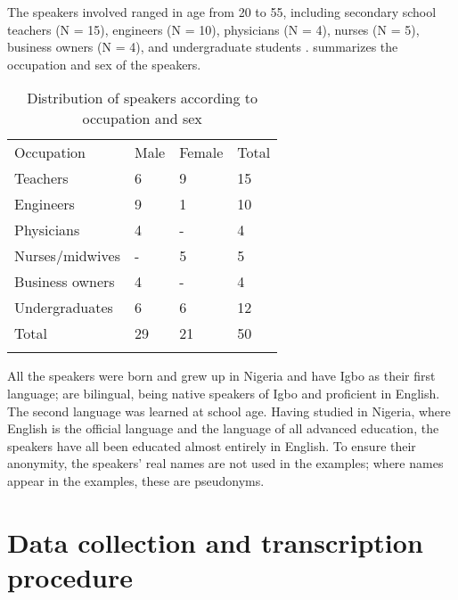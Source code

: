 \documentclass[output=paper]{langsci/langscibook}
\begin{document}
The speakers involved ranged in age from 20 to 55, including secondary school teachers (N = 15), engineers (N = 10), physicians (N = 4), nurses (N = 5), business owners (N = 4), and undergraduate students .  summarizes the occupation and sex of the speakers. 
 
\begin{table}
\caption{Distribution of speakers according to occupation and sex}
\label{tab:1}

\begin{tabularx}{\textwidth}{XXXX}
\lsptoprule

Occupation & Male & Female & Total\\
Teachers & 6 & 9 & 15\\
Engineers & 9 & 1 & 10\\
Physicians & 4 & - & 4\\
Nurses/midwives & - & 5 & 5\\
Business owners & 4 & - & 4\\
Undergraduates & 6 & 6 & 12\\
Total & 29 & 21 & 50\\
\lspbottomrule
\end{tabularx}

\end{table} 

All the speakers were born and grew up in Nigeria and have Igbo as their first language; are bilingual, being native speakers of Igbo and proficient in English. The second language was learned at school age. Having studied in Nigeria, where English is the official language and the language of all advanced education, the speakers have all been educated almost entirely in English. To ensure their anonymity, the speakers’ real names are not used in the examples; where names appear in the examples, these are pseudonyms.

\section{Data collection and transcription procedure}
\end{document}
